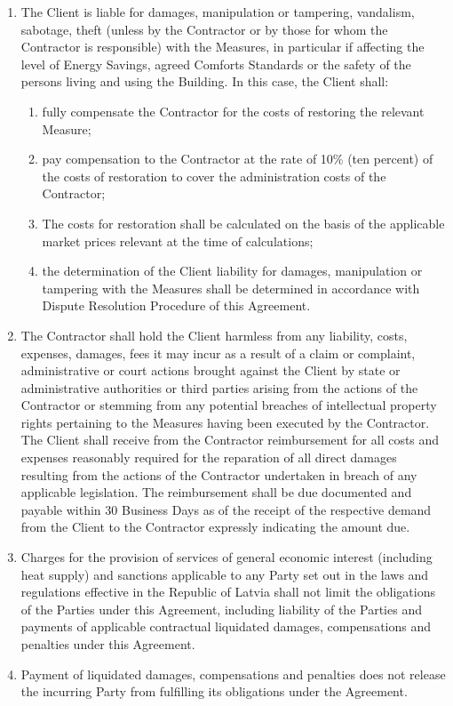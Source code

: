 \begin{multicols}{2}
\begin{enumerate}
\begin{enumerate}
	\end{enumerate}
	\item	The Client is liable for damages, manipulation or tampering, vandalism, sabotage, theft (unless by the Contractor or by those for whom the Contractor is responsible) with the Measures, in particular if affecting the level of Energy Savings, agreed Comforts Standards or the safety of the persons living and using the Building. In this case, the Client shall:
	\begin{enumerate}
		\item	fully compensate the Contractor for the costs of restoring the relevant Measure;
		\item	pay compensation to the Contractor at the rate of 10\% (ten percent) of the costs of restoration to cover the administration costs of the Contractor;
		\item	The costs for restoration shall be calculated on the basis of the applicable market prices relevant at the time of calculations;
		\item	the determination of the Client liability for damages, manipulation or tampering with the Measures shall be determined in accordance with Dispute Resolution Procedure of this Agreement.
	\end{enumerate}
	\item	The Contractor shall hold the Client harmless from any liability, costs, expenses, damages, fees it may incur as a result of a claim or complaint, administrative or court actions brought against the Client by state or administrative authorities or third parties arising from the actions of the Contractor or stemming from any potential breaches of intellectual property rights pertaining to the Measures having been executed by the Contractor. The Client shall receive from the Contractor reimbursement for all costs and expenses reasonably required for the reparation of all direct damages resulting from the actions of the Contractor undertaken in breach of any applicable legislation. The reimbursement shall be due documented and payable within 30 Business Days as of the receipt of the respective demand from the Client to the Contractor expressly indicating the amount due.
	\item	Charges for the provision of services of general economic interest (including heat supply) and sanctions applicable to any Party set out in the laws and regulations effective in the Republic of Latvia shall not limit the obligations of the Parties under this Agreement, including liability of the Parties and payments of applicable contractual liquidated damages, compensations and penalties under this Agreement.
	\item	Payment of liquidated damages, compensations and penalties does not release the incurring Party from fulfilling its obligations under the Agreement.
\end{enumerate}


\end{multicols}
